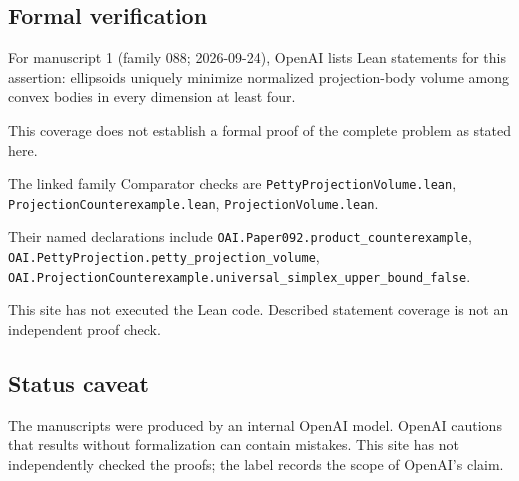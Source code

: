 \documentclass[11pt]{article}
\begin{document}
\subsection{Formal verification}
For manuscript 1 (family 088; 2026-09-24), OpenAI lists Lean statements for this assertion: ellipsoids uniquely minimize normalized projection-body volume among convex bodies in every dimension at least four.

This coverage does not establish a formal proof of the complete problem as stated here.

The linked family Comparator checks are \texttt{PettyProjectionVolume.lean}, \texttt{ProjectionCounterexample.lean}, \texttt{ProjectionVolume.lean}.

Their named declarations include \texttt{OAI.Paper092.product\_counterexample}, \texttt{OAI.PettyProjection.petty\_projection\_volume}, \texttt{OAI.ProjectionCounterexample.universal\_simplex\_upper\_bound\_false}.

This site has not executed the Lean code. Described statement coverage is not an independent proof check.

\subsection{Status caveat}
The manuscripts were produced by an internal OpenAI model. OpenAI cautions that results without formalization can contain mistakes. This site has not independently checked the proofs; the label records the scope of OpenAI's claim.
\end{document}
